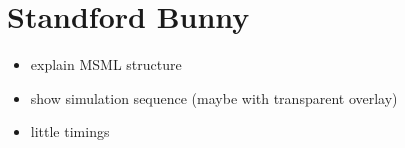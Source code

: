 \section{Standford Bunny}
\label{sec:bunny}

\begin{itemize}
\item explain MSML structure
\item show simulation sequence (maybe with transparent overlay)
\item little timings
\end{itemize}
